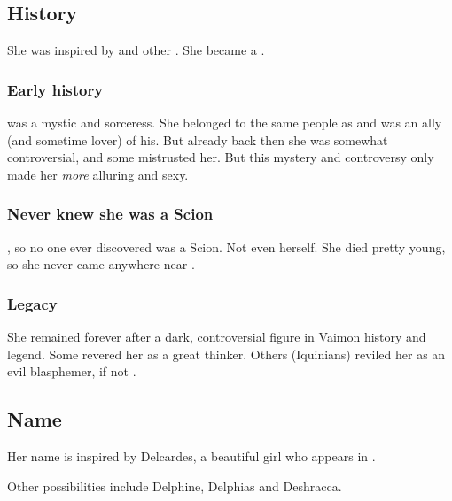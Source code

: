 \subsection{History}
She was inspired by  and other \qliphoth. 
She became a . 




\subsubsection{Early history}
\Delphine{} was a mystic and sorceress. 
She belonged to the same people as  and was an ally (and sometime lover) of his. 
But already back then she was somewhat controversial, and some mistrusted her. 
But this mystery and controversy only made her \emph{more} alluring and sexy. 





\subsubsection{Never knew she was a Scion}
, so no one ever discovered \Delphine{} was a Scion. 
Not even \Delphine{} herself. 
She died pretty young, so she never came anywhere near \Apotheosis. 





\subsubsection{Legacy}
She remained forever after a dark, controversial figure in Vaimon history and legend. 
Some revered her as a great thinker. 
Others (Iquinians) reviled her as an evil blasphemer, if not . 









\subsection{Name}
Her name is inspired by Delcardes, a beautiful girl who appears in \cite{RobertEHoward:TheCatandtheSkull}. 

Other possibilities include Delphine, Delphias and Deshracca.















